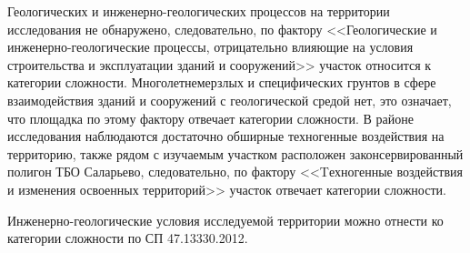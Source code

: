 Геологических и инженерно-геологических процессов 
на территории исследования не обнаружено, следовательно, по фактору 
<<Геологические и инженерно-геологические процессы, отрицательно влияющие 
на условия строительства и эксплуатации 
зданий и сооружений>> участок относится к  категории сложности. 
Многолетнемерзлых и специфических грунтов в сфере взаимодействия зданий и 
сооружений с геологической средой
нет, это означает, что площадка по этому фактору отвечает 
 категории сложности. 
В районе исследования наблюдаются достаточно обширные техногенные 
воздействия на территорию, 
также рядом с изучаемым участком расположен законсервированный 
полигон ТБО Саларьево, следовательно, по фактору 
<<Tехногенные воздействия и изменения освоенных территорий>> участок 
отвечает  категории сложности.

Инженерно-геологические условия исследуемой территории можно отнести
ко  категории сложности по СП 47.13330.2012.